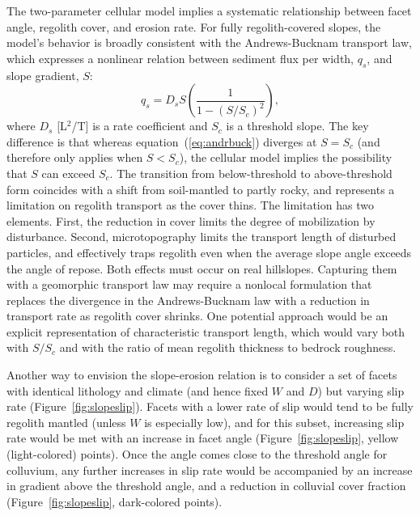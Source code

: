 The two-parameter cellular model implies a systematic relationship between facet angle, regolith cover, and erosion rate. For fully regolith-covered slopes, the model's behavior is broadly consistent with the Andrews-Bucknam transport law, which expresses a nonlinear relation between sediment flux per width, $q_s$, and slope gradient, $S$:
\begin{equation}
q_s = D_s S \left( \frac{1}{1-(S/S_c)^2} \right),
\label{eq:andrbuck}
\end{equation}
where $D_s$ [L$^2$/T] is a rate coefficient and $S_c$ is a threshold slope. The key difference is that whereas equation~(\ref{eq:andrbuck}) diverges at $S=S_c$ (and therefore only applies when $S<S_c$), the cellular model implies the possibility that $S$ can exceed $S_c$. The transition from below-threshold to above-threshold form coincides with a shift from soil-mantled to partly rocky, and represents a limitation on regolith transport as the cover thins. The limitation has two elements. First, the reduction in cover limits the degree of mobilization by disturbance. Second, microtopography limits the transport length of disturbed particles, and effectively traps regolith even when the average slope angle exceeds the angle of repose. Both effects must occur on real hillslopes. Capturing them with a geomorphic transport law may require a nonlocal formulation that replaces the divergence in the Andrews-Bucknam law with a reduction in transport rate as regolith cover shrinks. One potential approach would be an explicit representation of characteristic transport length, which would vary both with $S/S_c$ and with the ratio of mean regolith thickness to bedrock roughness.

Another way to envision the slope-erosion relation is to consider a set of facets with identical lithology and climate (and hence fixed $W$ and $D$) but varying slip rate (Figure~\ref{fig:slopeslip}). Facets with a lower rate of slip would tend to be fully regolith mantled (unless $W$ is especially low), and for this subset, increasing slip rate would be met with an increase in facet angle (Figure~\ref{fig:slopeslip}, yellow (light-colored) points). Once the angle comes close to the threshold angle for colluvium, any further increases in slip rate would be accompanied by an increase in gradient above the threshold angle, and a reduction in colluvial cover fraction (Figure~\ref{fig:slopeslip}, dark-colored points).


